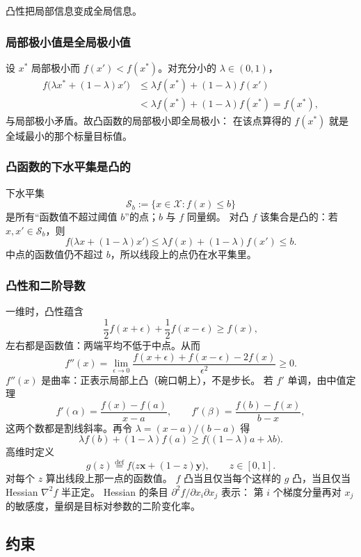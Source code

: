 凸性把局部信息变成全局信息。

\subsubsection{局部极小值是全局极小值}

设 $x^{\ast}$ 局部极小而 $f(x')<f(x^{\ast})$。对充分小的 $\lambda\in(0,1)$，
\begin{align*}
f\bigl(\lambda x^{\ast}+(1-\lambda)x'\bigr)
&\leq
\lambda f(x^{\ast})+(1-\lambda)f(x')
\\
&<
\lambda f(x^{\ast})+(1-\lambda)f(x^{\ast})
=f(x^{\ast}),
\end{align*}
与局部极小矛盾。故凸函数的局部极小即全局极小：
在该点算得的 $f(x^{\ast})$ 就是全域最小的那个标量目标值。

\subsubsection{凸函数的下水平集是凸的}

下水平集
\[
\mathcal{S}_b:=\{x\in\mathcal{X}:f(x)\leq b\}
\]
是所有“函数值不超过阈值 $b$”的点；$b$ 与 $f$ 同量纲。
对凸 $f$ 该集合是凸的：若 $x,x'\in\mathcal{S}_b$，则
\[
f\bigl(\lambda x+(1-\lambda)x'\bigr)
\leq
\lambda f(x)+(1-\lambda)f(x')
\leq b.
\]
中点的函数值仍不超过 $b$，所以线段上的点仍在水平集里。

\subsubsection{凸性和二阶导数}

一维时，凸性蕴含
\[
\frac12 f(x+\epsilon)+\frac12 f(x-\epsilon)
\geq f(x),
\]
左右都是函数值：两端平均不低于中点。从而
\[
f''(x)
=
\lim_{\epsilon\to 0}
\frac{f(x+\epsilon)+f(x-\epsilon)-2f(x)}{\epsilon^2}
\geq 0.
\]
$f''(x)$ 是曲率：正表示局部上凸（碗口朝上），不是步长。
若 $f'$ 单调，由中值定理
\[
f'(\alpha)=\frac{f(x)-f(a)}{x-a},\qquad
f'(\beta)=\frac{f(b)-f(x)}{b-x},
\]
这两个数都是割线斜率。再令 $\lambda=(x-a)/(b-a)$ 得
\[
\lambda f(b)+(1-\lambda)f(a)
\geq
f\bigl((1-\lambda)a+\lambda b\bigr).
\]
高维时定义
\[
g(z)\stackrel{\mathrm{def}}{=}
f\bigl(z\bm{x}+(1-z)\bm{y}\bigr),\qquad z\in[0,1].
\]
对每个 $z$ 算出线段上那一点的函数值。
$f$ 凸当且仅当每个这样的 $g$ 凸，当且仅当 Hessian $\nabla^2 f$ 半正定。
Hessian 的条目 $\partial^2 f/\partial x_i\partial x_j$ 表示：
第 $i$ 个梯度分量再对 $x_j$ 的敏感度，量纲是目标对参数的二阶变化率。

\subsection{约束}

